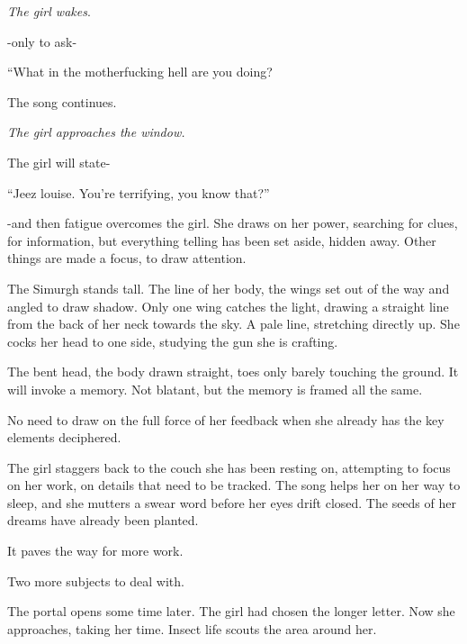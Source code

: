 \emph{The girl wakes}.



-only to ask-



``What in the motherfucking hell are you doing?



The song continues.



\emph{The girl approaches the window.}



The girl will state-



``Jeez louise.  You're terrifying, you know that?''



-and then fatigue overcomes the girl.  She draws on her power, searching for clues, for information, but everything telling has been set aside, hidden away.  Other things are made a focus, to draw attention.



The Simurgh stands tall.  The line of her body, the wings set out of the way and angled to draw shadow.  Only one wing catches the light, drawing a straight line from the back of her neck towards the sky.  A pale line, stretching directly up.  She cocks her head to one side, studying the gun she is crafting.



The bent head, the body drawn straight, toes only barely touching the ground.  It will invoke a memory.  Not blatant, but the memory is framed all the same.



No need to draw on the full force of her feedback when she already has the key elements deciphered.



The girl staggers back to the couch she has been resting on, attempting to focus on her work, on details that need to be tracked.  The song helps her on her way to sleep, and she mutters a swear word before her eyes drift closed.  The seeds of her dreams have already been planted.



It paves the way for more work.



Two more subjects to deal with.



The portal opens some time later.  The girl had chosen the longer letter.  Now she approaches, taking her time.  Insect life scouts the area around her.



